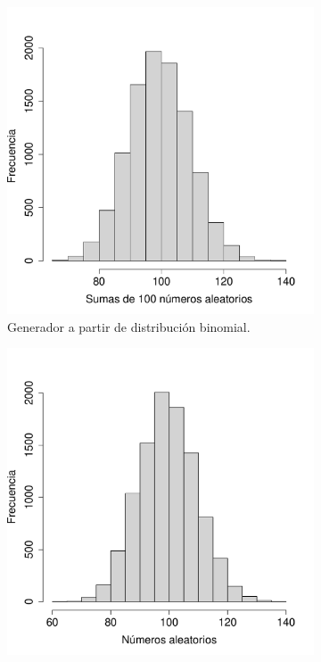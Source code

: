 \documentclass[paper=leter, fontsize=11pt]{scrartcl}
\numberwithin{equation}{section}		%
\numberwithin{figure}{section}			%
\numberwithin{table}{section}				%
\begin{document}
\begin{figure}
    \begin{subfigure}{.5\textwidth}
        \centering
        \includegraphics[scale=0.4]{binom.pdf}
        \caption{Generador a partir de distribución binomial.}
        \label{binom_izq}
    \end{subfigure}
    \begin{subfigure}{0.5\textwidth}
        \centering
        \includegraphics[scale=0.4]{binom_poisson.pdf}

\end{subfigure}
\end{figure}
\end{document}
